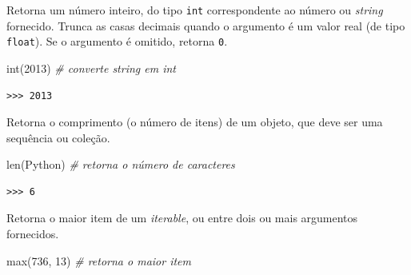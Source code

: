 \documentclass[
]{book}
\newenvironment{Shaded}{\begin{snugshade}}{\end{snugshade}}
\newcommand{\BuiltInTok}[1]{#1}
\newcommand{\CommentTok}[1]{\textcolor[rgb]{0.56,0.35,0.01}{\textit{#1}}}
\newcommand{\DecValTok}[1]{\textcolor[rgb]{0.00,0.00,0.81}{#1}}
\newcommand{\NormalTok}[1]{#1}
\newcommand{\StringTok}[1]{\textcolor[rgb]{0.31,0.60,0.02}{#1}}
\providecommand{\tightlist}{%
  \setlength{\itemsep}{0pt}\setlength{\parskip}{0pt}}
\begin{document}
\begin{description}
\tightlist
\item[\texttt{int(x)}]
Retorna um número inteiro, do tipo \texttt{int} correspondente ao número ou \emph{string} fornecido. Trunca as casas decimais quando o argumento é um valor real (de tipo \texttt{float}). Se o argumento é omitido, retorna \texttt{0}.
\end{description}

\begin{Shaded}
\begin{Highlighting}[]
\BuiltInTok{int}\NormalTok{(}\StringTok{\textquotesingle{}2013\textquotesingle{}}\NormalTok{) }\CommentTok{\# converte string em int}
\end{Highlighting}
\end{Shaded}

\begin{verbatim}
>>> 2013
\end{verbatim}

\begin{description}
\tightlist
\item[\texttt{len(objeto)}]
Retorna o comprimento (o número de itens) de um objeto, que deve ser uma sequência ou coleção.
\end{description}

\begin{Shaded}
\begin{Highlighting}[]
\BuiltInTok{len}\NormalTok{(}\StringTok{\textquotesingle{}Python\textquotesingle{}}\NormalTok{) }\CommentTok{\# retorna o número de caracteres}
\end{Highlighting}
\end{Shaded}

\begin{verbatim}
>>> 6
\end{verbatim}

\begin{description}
\tightlist
\item[\texttt{max(arg0,\ *arg1)}]
Retorna o maior item de um \emph{iterable}, ou entre dois ou mais argumentos fornecidos.
\end{description}

\begin{Shaded}
\begin{Highlighting}[]
\BuiltInTok{max}\NormalTok{(}\DecValTok{736}\NormalTok{, }\DecValTok{13}\NormalTok{) }\CommentTok{\# retorna o maior item}
\end{Highlighting}
\end{Shaded}
\end{document}
